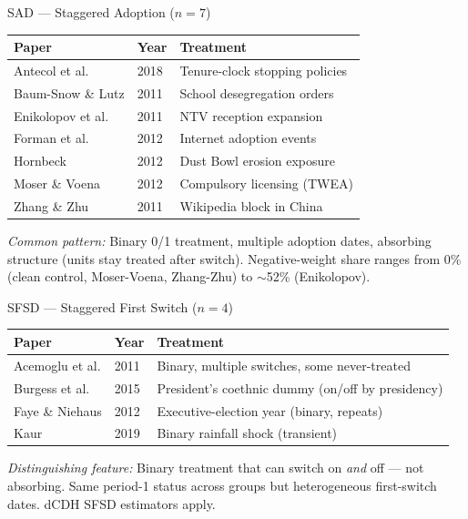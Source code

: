 \documentclass[10pt,aspectratio=169]{beamer}
\begin{document}
\begin{frame}{\textcolor{sadColor}{SAD} --- Staggered Adoption ($n=7$)}
\small
\begin{tabular}{ll>{\raggedright\arraybackslash}p{6cm}}
\toprule
\textbf{Paper} & \textbf{Year} & \textbf{Treatment} \\
\midrule
Antecol et al.        & 2018 & Tenure-clock stopping policies \\
Baum-Snow \& Lutz     & 2011 & School desegregation orders \\
Enikolopov et al.     & 2011 & NTV reception expansion \\
Forman et al.         & 2012 & Internet adoption events \\
Hornbeck              & 2012 & Dust Bowl erosion exposure \\
Moser \& Voena        & 2012 & Compulsory licensing (TWEA) \\
Zhang \& Zhu          & 2011 & Wikipedia block in China \\
\bottomrule
\end{tabular}

\vspace{0.8em}
\footnotesize
\textit{Common pattern:} Binary 0/1 treatment, multiple adoption dates, absorbing structure (units stay treated after switch). Negative-weight share ranges from 0\% (clean control, Moser-Voena, Zhang-Zhu) to $\sim$52\% (Enikolopov).
\end{frame}

\begin{frame}{\textcolor{sfsdColor}{SFSD} --- Staggered First Switch ($n=4$)}
\small
\begin{tabular}{ll>{\raggedright\arraybackslash}p{7cm}}
\toprule
\textbf{Paper} & \textbf{Year} & \textbf{Treatment} \\
\midrule
Acemoglu et al.    & 2011 & Binary, multiple switches, some never-treated \\
Burgess et al.     & 2015 & President's coethnic dummy (on/off by presidency) \\
Faye \& Niehaus    & 2012 & Executive-election year (binary, repeats) \\
Kaur               & 2019 & Binary rainfall shock (transient) \\
\bottomrule
\end{tabular}

\vspace{0.8em}
\footnotesize
\textit{Distinguishing feature:} Binary treatment that can switch on \emph{and} off --- not absorbing. Same period-1 status across groups but heterogeneous first-switch dates. dCDH SFSD estimators apply.
\end{frame}
\end{document}
